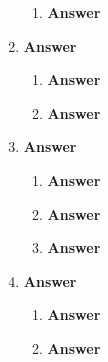 \documentclass[11pt]{article}
\begin{document}
\begin{enumerate}[label=(\alph*)]
\begin{enumerate}[label=(\roman*)]
\item 

\noindent\textbf{Answer}



\end{enumerate}


\item  \textbf{Answer}

\begin{enumerate}[label=(\roman*)]

\item 

\noindent\textbf{Answer}

\item 

\noindent\textbf{Answer}

\end{enumerate}


\item  \textbf{Answer}

\begin{enumerate}[label=(\roman*)]

\item 

\noindent\textbf{Answer}

\item 

\noindent\textbf{Answer}

\item 

\noindent\textbf{Answer}

\end{enumerate}


\item  \textbf{Answer}

\begin{enumerate}[label=(\roman*)]

\item 

\noindent\textbf{Answer}

\item 

\noindent\textbf{Answer}

\end{enumerate}

\end{enumerate}
\end{document}
